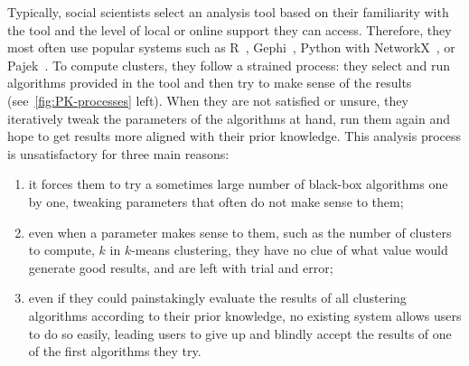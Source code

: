 Typically, social scientists select an analysis tool based on their familiarity with the tool and the level of local or online support they can access.
Therefore, they most often use popular systems such as R~\cite{Rstat}, Gephi~\cite{Gephi}, Python with NetworkX~\cite{networkx}, or Pajek~\cite{pajek}.
To compute clusters, they follow a strained process: they select and run algorithms provided in the tool and then try to make sense of the results (see~\autoref{fig:PK-processes} left).
When they are not satisfied or unsure, they iteratively tweak the parameters of the algorithms at hand, run them again and hope to get results more aligned with their prior knowledge. This analysis process is unsatisfactory for three main reasons:
\begin{enumerate}
    \item it forces them to try a sometimes large number of black-box algorithms one by one, tweaking parameters that often do not make sense to them; \item even when a parameter makes sense to them, such as the number of clusters to compute, $k$ in $k$-means clustering, they have no clue of what value would generate good results, and are left with trial and error;
    \item even if they could %
    painstakingly evaluate the results of all clustering algorithms  according to their prior knowledge, no existing system allows users to do so easily, leading users to give up and blindly accept the results of one of the first algorithms they try.
\end{enumerate}



